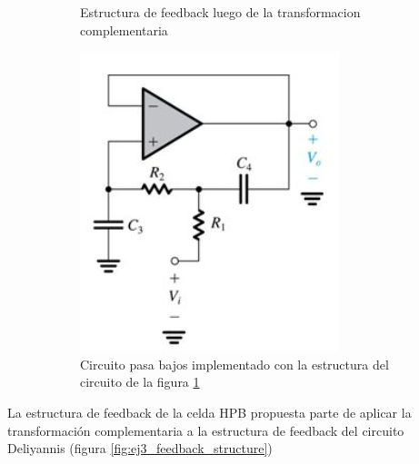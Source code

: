 \documentclass[../../tc_tp5_main.tex]{subfiles}
\begin{document}
\begin{figure}[H]
\begin{subfigure}[t]{0.3\textwidth}
		\caption{Estructura de feedback luego de la transformacion complementaria}
		\label{fig:ej3_comp_trans_after}
	\end{subfigure}%
	\hfill
	\begin{subfigure}[t]{0.3\textwidth}
		\centering
		\includegraphics[width=\textwidth]{imagenes/comp_trans_signal.png}
		\caption{Circuito pasa bajos implementado con la estructura del circuito de la figura \ref{fig:ej3_comp_trans_after}}
		\label{fig:ej3_comp_trans_signal}
	\end{subfigure}	
	\caption{}
\end{figure}


La estructura de feedback de la celda HPB propuesta parte de aplicar la transformaci\'on complementaria a la estructura de feedback del circuito Deliyannis (figura \ref{fig:ej3_feedback_structure})
\end{document}
